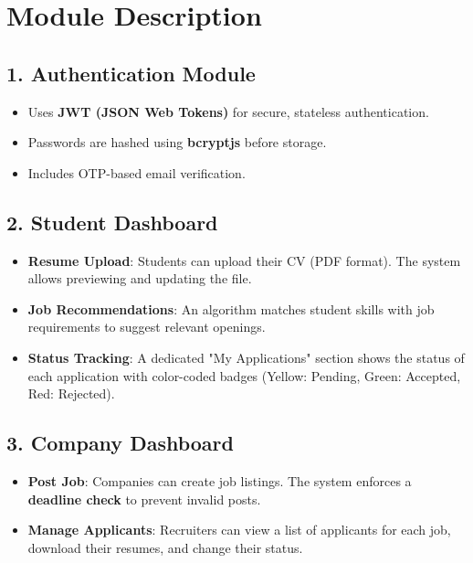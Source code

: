 \documentclass[12pt, a4paper]{report}
\begin{document}
\section{Module Description}

\subsection{1. Authentication Module}
\begin{itemize}
    \item Uses \textbf{JWT (JSON Web Tokens)} for secure, stateless authentication.
    \item Passwords are hashed using \textbf{bcryptjs} before storage.
    \item Includes OTP-based email verification.
\end{itemize}

\subsection{2. Student Dashboard}
\begin{itemize}
    \item \textbf{Resume Upload}: Students can upload their CV (PDF format). The system allows previewing and updating the file.
    \item \textbf{Job Recommendations}: An algorithm matches student skills with job requirements to suggest relevant openings.
    \item \textbf{Status Tracking}: A dedicated "My Applications" section shows the status of each application with color-coded badges (Yellow: Pending, Green: Accepted, Red: Rejected).
\end{itemize}

\subsection{3. Company Dashboard}
\begin{itemize}
    \item \textbf{Post Job}: Companies can create job listings. The system enforces a \textbf{deadline check} to prevent invalid posts.
    \item \textbf{Manage Applicants}: Recruiters can view a list of applicants for each job, download their resumes, and change their status.
\end{itemize}
\end{document}
